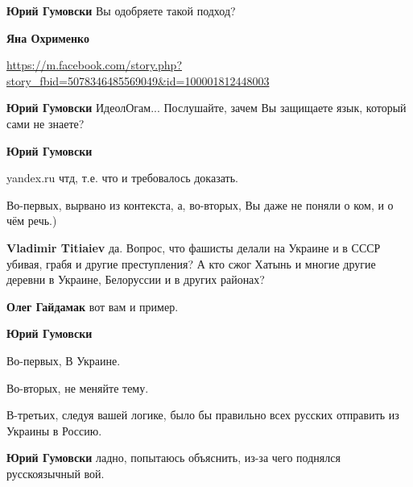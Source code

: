 \begin{itemize}
\begin{itemize}
\textbf{Юрий Гумовски} Вы одобряете такой подход?


\textbf{Яна Охрименко} 

\url{https://m.facebook.com/story.php?story_fbid=5078346485569049&id=100001812448003}


\textbf{Юрий Гумовски} ИдеолОгам... Послушайте, зачем Вы защищаете язык, который сами не знаете?


\textbf{Юрий Гумовски} 

yandex.ru чтд, т.е. что и требовалось доказать.

Во-первых, вырвано из контекста, а, во-вторых, Вы даже не поняли о ком, и о чём
речь.)


\textbf{Vladimir Titiaiev} да. Вопрос, что фашисты делали на Украине и в СССР убивая, грабя и другие преступления? А кто сжог Хатынь и многие другие деревни в Украине, Белоруссии и в других районах?



\textbf{Олег Гайдамак} вот вам и пример.


\textbf{Юрий Гумовски} 

Во-первых, В Украине. 

Во-вторых, не меняйте тему.

В-третьих, следуя вашей логике, было бы правильно всех русских отправить из
Украины в Россию.


\textbf{Юрий Гумовски} ладно, попытаюсь объяснить, из-за чего поднялся русскоязычный вой.


\end{itemize}
\end{itemize}
